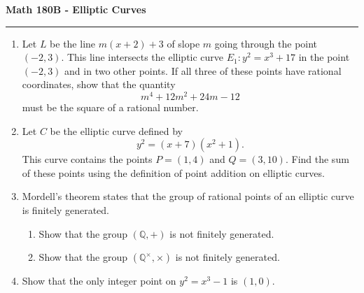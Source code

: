 \documentclass[11pt,letterpaper]{report}
\newcommand{\rationals}{\mathbb{Q}}
\begin{document}
\begin{center}
{\bf \Large Math 180B - Elliptic Curves}
\vspace{0.2cm}
\hrule
\end{center}

\begin{enumerate}
	\item Let $L$ be the line $m(x+2) + 3$ of slope $m$ going through the point $(-2, 3)$. This line intersects the elliptic curve $E_1: y^2 = x^3 + 17$ in the point $(-2, 3)$ and in two other points. If all three of these points have rational coordinates, show that the quantity
	\[
	m^4 + 12m^2 + 24m -12
	\]
	must be the square of a rational number.

	\vfill

	\item Let $C$ be the elliptic curve defined by
	\[
	y^2 = (x+7)(x^2+1).
	\]
	This curve contains the points $P = (1, 4)$ and $Q = (3, 10)$. Find the sum of these points using the definition of point addition on elliptic curves.

	\vfill

	\item Mordell's theorem states that the group of rational points of an elliptic curve is finitely generated.
	\begin{enumerate}
		\item Show that the group $(\rationals, +)$ is not finitely generated.
		\item Show that the group $(\rationals^\times, \times)$ is not finitely generated.
	\end{enumerate}

	\vfill

	\item Show that the only integer point on $y^2 = x^3-1$ is $(1, 0)$.
	\vfill
\end{enumerate}
\end{document}
